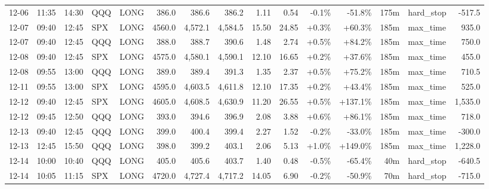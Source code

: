 \documentclass[11pt,a4paper,twoside]{article}
\begin{document}
\begin{landscape}
\begin{center}
\begin{longtable}{>{\color{txtmain}}l l l l l r r r r r r r r >{\color{txtmain}}l r}
12-06 & 11:35 & 14:30 & QQQ & LONG & 386.0 & 386.6 & 386.2 & 1.11 & 0.54 & \textcolor{lossred}{-0.1\%} & \textcolor{lossred}{-51.8\%} & 175m & hard\_stop & \textcolor{lossred}{-517.5} \\
12-07 & 09:40 & 12:45 & SPX & LONG & 4560.0 & 4,572.1 & 4,584.5 & 15.50 & 24.85 & \textcolor{wingreen}{+0.3\%} & \textcolor{wingreen}{+60.3\%} & 185m & max\_time & \textcolor{wingreen}{935.0} \\
12-07 & 09:40 & 12:45 & QQQ & LONG & 388.0 & 388.7 & 390.6 & 1.48 & 2.74 & \textcolor{wingreen}{+0.5\%} & \textcolor{wingreen}{+84.2\%} & 185m & max\_time & \textcolor{wingreen}{750.0} \\
12-08 & 09:40 & 12:45 & SPX & LONG & 4575.0 & 4,580.1 & 4,590.1 & 12.10 & 16.65 & \textcolor{wingreen}{+0.2\%} & \textcolor{wingreen}{+37.6\%} & 185m & max\_time & \textcolor{wingreen}{455.0} \\
12-08 & 09:55 & 13:00 & QQQ & LONG & 389.0 & 389.4 & 391.3 & 1.35 & 2.37 & \textcolor{wingreen}{+0.5\%} & \textcolor{wingreen}{+75.2\%} & 185m & max\_time & \textcolor{wingreen}{710.5} \\
12-11 & 09:55 & 13:00 & SPX & LONG & 4595.0 & 4,603.5 & 4,611.8 & 12.10 & 17.35 & \textcolor{wingreen}{+0.2\%} & \textcolor{wingreen}{+43.4\%} & 185m & max\_time & \textcolor{wingreen}{525.0} \\
12-12 & 09:40 & 12:45 & SPX & LONG & 4605.0 & 4,608.5 & 4,630.9 & 11.20 & 26.55 & \textcolor{wingreen}{+0.5\%} & \textcolor{wingreen}{+137.1\%} & 185m & max\_time & \textcolor{wingreen}{1,535.0} \\
12-12 & 09:45 & 12:50 & QQQ & LONG & 393.0 & 394.6 & 396.9 & 2.08 & 3.88 & \textcolor{wingreen}{+0.6\%} & \textcolor{wingreen}{+86.1\%} & 185m & max\_time & \textcolor{wingreen}{718.0} \\
12-13 & 09:40 & 12:45 & QQQ & LONG & 399.0 & 400.4 & 399.4 & 2.27 & 1.52 & \textcolor{lossred}{-0.2\%} & \textcolor{lossred}{-33.0\%} & 185m & max\_time & \textcolor{lossred}{-300.0} \\
12-13 & 12:45 & 15:50 & QQQ & LONG & 398.0 & 399.2 & 403.1 & 2.06 & 5.13 & \textcolor{wingreen}{+1.0\%} & \textcolor{wingreen}{+149.0\%} & 185m & max\_time & \textcolor{wingreen}{1,228.0} \\
12-14 & 10:00 & 10:40 & QQQ & LONG & 405.0 & 405.6 & 403.7 & 1.40 & 0.48 & \textcolor{lossred}{-0.5\%} & \textcolor{lossred}{-65.4\%} & 40m & hard\_stop & \textcolor{lossred}{-640.5} \\
12-14 & 10:05 & 11:15 & SPX & LONG & 4720.0 & 4,727.4 & 4,717.2 & 14.05 & 6.90 & \textcolor{lossred}{-0.2\%} & \textcolor{lossred}{-50.9\%} & 70m & hard\_stop & \textcolor{lossred}{-715.0} \\

\end{longtable}
\end{center}
\end{landscape}
\end{document}
